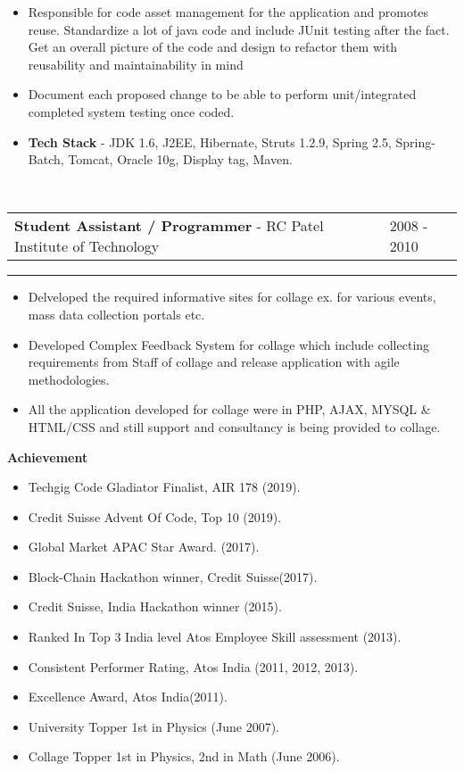 \documentclass[10pt,A4]{article}
\newcommand{\cvsection}[1]
{
	\begin{center}
		\large\textcolor{sectcol}{\textbf{#1}}
	\end{center}
}
\newcommand{\cvevent}[4]
{

\begin{tabular*}{1\textwidth}{p{13.6cm}  x{3.9cm}}
	\textbf{#2} - \textcolor{bgcol}{#3} &   \vspace{2.0pt}\textcolor{sectcol}{#1}
\end{tabular*}

\vspace{-8pt}
\textcolor{softcol}{\hrule}
\vspace{6pt}

  #4 

}
\begin{document}
{\begin{itemize}
\item Responsible for code asset management for the application and promotes reuse.
Standardize a lot of java code and include JUnit testing after the fact.
Get an overall picture of the code and design to refactor them with reusability and
maintainability in mind
\item Document each proposed change to be able to perform unit/integrated completed
system testing once coded.

\item \textbf{Tech Stack} - JDK 1.6, J2EE, Hibernate, Struts 1.2.9, Spring 2.5,
Spring-Batch, Tomcat, Oracle 10g, Display tag, Maven.

\end{itemize}
}

\ \\
%
\cvevent{2008 - 2010}
{Student Assistant / Programmer}
{RC Patel Institute of Technology}
{
\begin{itemize}
	\item Delveloped the required informative sites for collage ex. for various events, mass data collection portals etc.
	\item Developed Complex Feedback System for collage which include collecting requirements from Staff of collage and release application with agile methodologies.
	\item All the application developed for collage were in PHP, AJAX, MYSQL \& HTML/CSS and still support and consultancy is being provided to collage.
\end{itemize}

}

\cvsection{Achievement}

\begin{itemize}
\item Techgig Code Gladiator Finalist, AIR 178 (2019).
\item Credit Suisse Advent Of Code, Top 10 (2019).
\item Global Market APAC Star Award. (2017).
\item Block-Chain Hackathon winner, Credit Suisse(2017).
\item Credit Suisse, India Hackathon winner (2015).
\item Ranked In Top 3 India level Atos Employee Skill assessment (2013).
\item Consistent Performer Rating, Atos India (2011, 2012, 2013).
\item Excellence Award, Atos India(2011).
\item University Topper 1st in Physics (June 2007).
\item Collage Topper 1st in Physics, 2nd in Math (June 2006).
\end{itemize}
\end{document}
